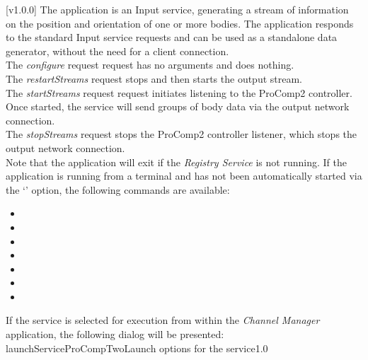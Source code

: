 [v1.0.0]
The  application is an Input service,
generating a stream of information on the position and orientation of one or more bodies.
The application responds to the standard Input service requests and can be used as a
standalone data generator, without the need for a client connection.\\

The \emph{configure} request request has no arguments and does nothing.\\

The \emph{restartStreams} request stops and then starts the output stream.\\

The \emph{startStreams} request request initiates listening to the ProComp2 controller.
Once started, the service will send groups of body data via the output \yarp{} network
connection.\\

The \emph{stopStreams} request stops the ProComp2 controller listener, which stops the
output \yarp{} network connection.\\ 

Note that the application will exit if the \emph{Registry Service} is not running.
\insertAppParameters
\insertTagDescription{\PCtwoI}
\insertInputServiceComment
\condPage{}
If the application is running from a terminal and has not been automatically started via
the `' option, the following commands are available:
\begin{itemize}
\item{}
\item\exSp{}
\item\exSp{}
\item\exSp{}
\item\exSp{}
\item\exSp{}
\item\exSp{}
\end{itemize}
\secondaryEnd
\condPage
{}
If the service is selected for execution from within the \emph{Channel Manager}
application, the following dialog will be presented:
%
{launchServiceProCompTwo}{Launch options for the \PCtwoI{} service}{1.0}

